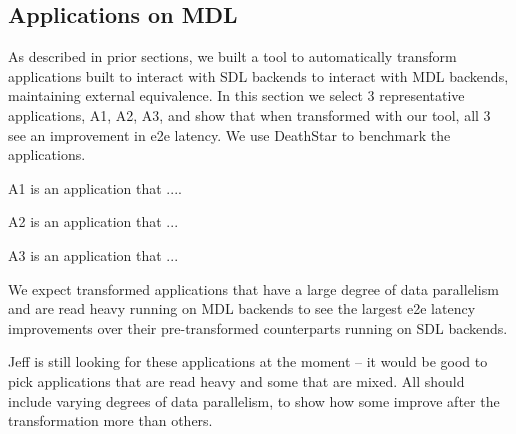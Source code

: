 \subsection{Applications on MDL}
\label{sec:apps}

As described in prior sections, we built a tool to automatically transform applications built to interact with SDL backends to interact with MDL backends, maintaining external equivalence. In this section we select 3 representative applications, A1, A2, A3, and show that when transformed with our tool, all 3 see an improvement in e2e latency. We use DeathStar to benchmark the applications.

A1 is an application that ....

A2 is an application that ...

A3 is an application that ...

We expect transformed applications that have a large degree of data parallelism and are read heavy running on MDL backends to see the largest e2e latency improvements over their pre-transformed counterparts running on SDL backends.

Jeff is still looking for these applications at the moment -- it would be good to pick applications that are read heavy and some that are mixed. All should include varying degrees of data parallelism, to show how some improve after the transformation more than others.
